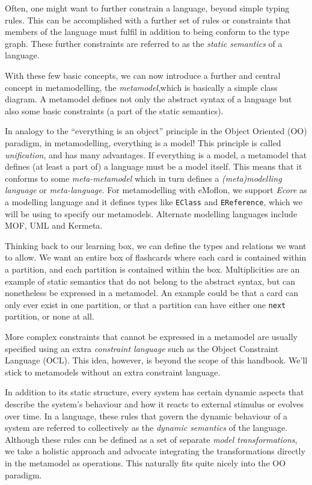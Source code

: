 Often, one might want to further constrain a language, beyond simple typing rules. This can be accomplished with a further set of rules or constraints that
members of the language must fulfil in addition to being conform to the type graph. These further constraints are referred to as the
\emph{static semantics} of a language.

With these few basic concepts, we can now introduce a further and central concept in metamodelling, the \emph{metamodel},which is basically
a simple class diagram. A metamodel defines not only the abstract syntax of a language but also some basic constraints (a part of the static semantics).

In analogy to the ``everything is an object'' principle in the Object Oriented
(OO) paradigm, in metamodelling, everything is a model! This principle is called \emph{unification}, and has many
advantages. If everything is a model, a metamodel that defines (at least a part of) a language must be a model itself. This means that it conforms to some
\emph{meta-metamodel} which in turn defines a \emph{(meta)modelling language} or \emph{meta-language}. For
metamodelling with eMoflon, we support \emph{Ecore} as a modelling language and it defines types like \texttt{EClass} and \texttt{EReference}, which we will be using to specify  our metamodels. Alternate modelling languages include MOF,
UML and Kermeta.

Thinking back to our learning box, we can define the types and relations we want to allow. We want an entire box of flashcards where each card is contained
within a partition, and each partition is contained within the box. Multiplicities are an example of static semantics that do not belong to the abstract
syntax, but can nonetheless be expressed in a metamodel. An example could be that a card can only ever exist in one partition, or that a partition can have
either one \texttt{next} partition, or none at all.

More complex constraints that cannot be expressed in a metamodel are usually specified using an extra \emph{constraint language}
such as the Object Constraint Language (OCL). This idea, however,  is beyond the scope of this handbook. We'll stick to metamodels without an extra
constraint language.

In addition to its static structure, every system has certain dynamic aspects that describe the system's behaviour and how it reacts to external stimulus or
evolves over time. In a language, these rules that govern the dynamic behaviour of a system are referred to collectively as the
\emph{dynamic semantics} of the language. Although these rules can be defined as a set of separate \emph{model transformations}, we
take a holistic approach and advocate integrating the transformations directly in the metamodel as operations. This naturally fits quite nicely into the OO
paradigm.

